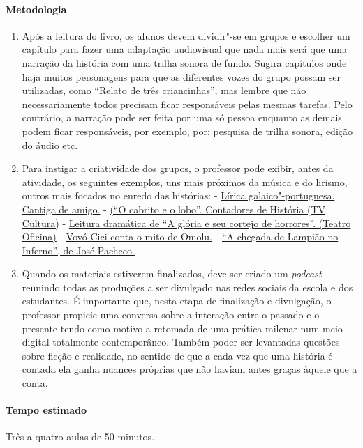 \documentclass[12pt]{extarticle}
\begin{document}
 \paragraph{Metodologia}
 	\begin{enumerate}
 		\item
 		Após a leitura do livro, os alunos devem dividir"-se em grupos 
 		e escolher um capítulo para fazer uma adaptação audiovisual que nada
 		mais será que uma narração da história com uma trilha sonora de fundo. 
 		Sugira capítulos onde haja muitos personagens para que as diferentes vozes 
 		do grupo possam ser utilizadas, como ``Relato de três criancinhas'', mas
 		lembre que não necessariamente todos precisam ficar responsáveis pelas
 		mesmas tarefas. Pelo contrário, a narração pode ser feita por uma
 		só pessoa enquanto as demais podem ficar responsáveis, por exemplo,
 		por: pesquisa de trilha sonora, edição do áudio etc. 
 		\item
 		Para instigar a criatividade dos grupos, o professor pode exibir, antes
 		da atividade, os seguintes exemplos, uns mais próximos da música e do lirismo,
 		outros mais focados no enredo das histórias:
 		- \href{https://www.youtube.com/watch?v=1M_VcqHoQ1M}{Lírica galaico"-portuguesa. Cantiga de amigo.}
 		- \href{https://www.youtube.com/watch?v=wLeI9KlGPq4}{(``O cabrito e o lobo''. Contadores de
 		História (TV Cultura)}
 		- \href{https://www.youtube.com/watch?v=ZrqRLzsp9tA&t=1429s}{Leitura dramática de ``A glória
 		e seu cortejo de horrores''. (Teatro Oficina)}
 		- \href{https://www.youtube.com/watch?v=MKLYfnAiIUE}{Vovó Cici conta o mito de Omolu.}
 		- \href{https://www.youtube.com/watch?v=4ldSot7OLeU}{``A chegada de Lampião no Inferno'', de José Pacheco.}
 		\item
 		Quando os materiais estiverem finalizados, deve ser criado um \textit{podcast} reunindo
 		todas as produções a ser divulgado nas redes sociais da escola e dos estudantes. 
 		É importante que, nesta etapa de finalização e divulgação, o professor propicie
 		uma conversa sobre a interação entre o passado e o presente tendo como motivo
 		a retomada de uma prática milenar num meio digital totalmente contemporâneo. 
 		Também poder ser levantadas questões sobre ficção e realidade, no sentido 
 		de que a cada vez que uma história é contada ela ganha nuances próprias
 		que não haviam antes graças àquele que a conta.
 	\end{enumerate}

 \paragraph{Tempo estimado} Três a quatro aulas de 50 minutos. 
\end{document}
